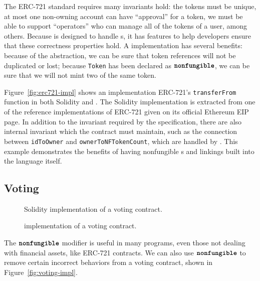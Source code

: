 \documentclass[dvipsnames, usenames, sigconf]{acmart}
\begin{document}
The ERC-721 standard  requires many invariants hold:
    the tokens must be unique,
    at most one non-owning account can have ``approval'' for a token,
    we must be able to support ``operators'' who can manage all of the tokens of a user,
    among others.
Because \langName is designed to handle \assetTxt{}s, it has features to help developers ensure that these correctness properties hold.
A \langName implementation has several benefits: because of the \assetTxt abstraction, we can be sure that token references will not be duplicated or lost; because \lstinline{Token} has been declared as $\textbf{\texttt{nonfungible}}$, we can be sure that we will not mint two of the same token.

Figure~\ref{fig:erc721-impl} shows an implementation ERC-721's \lstinline{transferFrom} function in both Solidity and \langName.
The Solidity implementation is extracted from one of the reference implementations of ERC-721 given on its official Ethereum EIP page.
In addition to the invariant required by the specification, there are also internal invariant which the contract must maintain, such as the connection between \lstinline{idToOwner} and \lstinline{ownerToNFTokenCount}, which are handled by \langName.
This example demonstrates the benefits of having nonfungible \assetTxt{}s and linkings built into the language itself.

\subsection{Voting}
\begin{figure*}[h]
    \centering
    \begin{subfigure}[t]{0.5\textwidth}
        \centering
        
        \caption{Solidity implementation of a voting contract.}
    \end{subfigure}%
    \begin{subfigure}[t]{0.5\textwidth}
        \centering
        
        \caption{\langName implementation of a voting contract.}
    \end{subfigure}
    \label{fig:voting-impl}
\end{figure*}

The $\textbf{\texttt{nonfungible}}$ modifier is useful in many programs, even those not dealing with financial assets, like ERC-721 contracts.
We can also use $\textbf{\texttt{nonfungible}}$ to remove certain incorrect behaviors from a voting contract, shown in Figure~\ref{fig:voting-impl}.
\end{document}
